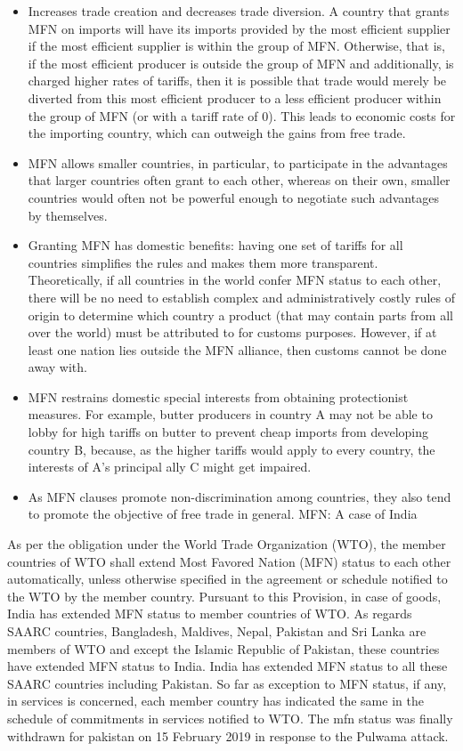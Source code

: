 \documentclass[
  openany]{book}
\providecommand{\tightlist}{%
  \setlength{\itemsep}{0pt}\setlength{\parskip}{0pt}}
\begin{document}
\begin{itemize}
\tightlist
\item
  Increases trade creation and decreases trade diversion. A country that grants MFN on imports will have its imports provided by the most efficient supplier if the most efficient supplier is within the group of MFN. Otherwise, that is, if the most efficient producer is outside the group of MFN and additionally, is charged higher rates of tariffs, then it is possible that trade would merely be diverted from this most efficient producer to a less efficient producer within the group of MFN (or with a tariff rate of 0). This leads to economic costs for the importing country, which can outweigh the gains from free trade.
\item
  MFN allows smaller countries, in particular, to participate in the advantages that larger countries often grant to each other, whereas on their own, smaller countries would often not be powerful enough to negotiate such advantages by themselves.
\item
  Granting MFN has domestic benefits: having one set of tariffs for all countries simplifies the rules and makes them more transparent. Theoretically, if all countries in the world confer MFN status to each other, there will be no need to establish complex and administratively costly rules of origin to determine which country a product (that may contain parts from all over the world) must be attributed to for customs purposes. However, if at least one nation lies outside the MFN alliance, then customs cannot be done away with.
\item
  MFN restrains domestic special interests from obtaining protectionist measures. For example, butter producers in country A may not be able to lobby for high tariffs on butter to prevent cheap imports from developing country B, because, as the higher tariffs would apply to every country, the interests of A's principal ally C might get impaired.
\item
  As MFN clauses promote non-discrimination among countries, they also tend to promote the objective of free trade in general.
  MFN: A case of India
\end{itemize}

As per the obligation under the World Trade Organization (WTO), the member countries of WTO shall extend Most Favored Nation (MFN) status to each other automatically, unless otherwise specified in the agreement or schedule notified to the WTO by the member country. Pursuant to this Provision, in case of goods, India has extended MFN status to member countries of WTO. As regards SAARC countries, Bangladesh, Maldives, Nepal, Pakistan and Sri Lanka are members of WTO and except the Islamic Republic of Pakistan, these countries have extended MFN status to India. India has extended MFN status to all these SAARC countries including Pakistan. So far as exception to MFN status, if any, in services is concerned, each member country has indicated the same in the schedule of commitments in services notified to WTO. The mfn status was finally withdrawn for pakistan on 15 February 2019 in response to the Pulwama attack.
\end{document}
